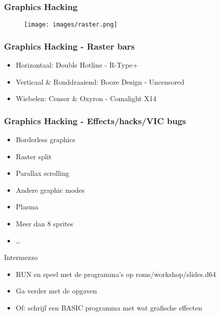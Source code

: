 
\begin{frame}
\frametitle{Graphics Hacking}

\begin{figure}
\texttt{[image: images/raster.png]}
\end{figure}

\end{frame}


\begin{frame}
\frametitle{Graphics Hacking - Raster bars}

\begin{itemize}
\item Horizontaal: Double Hotline - R-Type+
\item Verticaal \& Ronddraaiend: Booze Design - Uncensored
\item Wiebelen: Censor \& Oxyron - Comalight X14
\end{itemize}

\end{frame}


\begin{frame}
\frametitle{Graphics Hacking - Effects/hacks/VIC bugs}

\begin{itemize}
\item Borderless graphics
\item Raster split
\item Parallax scrolling
\item Andere graphic modes
\item Plasma
\item Meer dan 8 sprites
\item \dots
\end{itemize}

\end{frame}


\begin{frame}{Intermezzo}

\begin{itemize}
\item RUN en speel met de programma's op roms/workshop/slides.d64
\item Ga verder met de opgaven
\item Of: schrijf een BASIC programma met wat grafische effecten
\end{itemize}

\end{frame}
